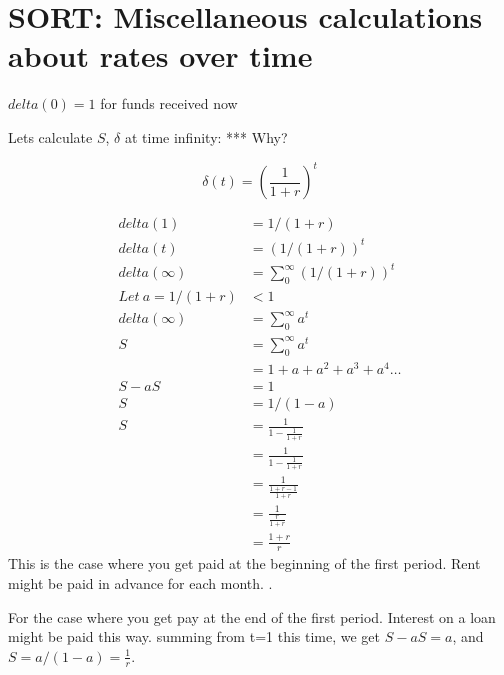 \section{SORT: Miscellaneous calculations about rates over time}
$delta(0)=1$  for funds received now

Lets calculate $S$, $\delta$ at time infinity:
*** Why?

\[\delta(t)=\left(\frac{1}{1+r}\right)^t\]

\begin{align}
delta (1)   &= 1/(1+r) \\
delta (t)   &= (1/(1+r))^t \\
delta (\infty)   &= \sum_0^\infty\left(1/(1+r)\right)^t\\ 
Let\ a=1/(1+r)&<1\\
delta (\infty)   &= \sum_0^\infty a^t\\ 
S               &= \sum_0^\infty a^t\\ 
               &= 1+a+a^2+a^3+a^4 \dots\\ 
S-aS             &= 1\\ 
S             &= 1/(1-a)\\ 
S             &= \frac{1}{1-\frac{1}{1+r}}\\ %
             &= \frac{1}{1-\frac{1}{1+r}}\\ 
             &= \frac{1}{\frac{1+r-1}{1+r}}\\ 
              &= \frac{1}{\frac{r}{1+r}}\\ 
             &= \frac{1+r}{r}
\end{align}
This is the case where you get paid at the beginning of the first period. Rent might be paid in advance for each month. .

For  the case where you get pay at the end of the first period. Interest on a loan  might be paid this way.  summing from t=1 this time, we get $S-aS =a$, and $S = a/(1-a)= \frac{1}{r}$. 

 


